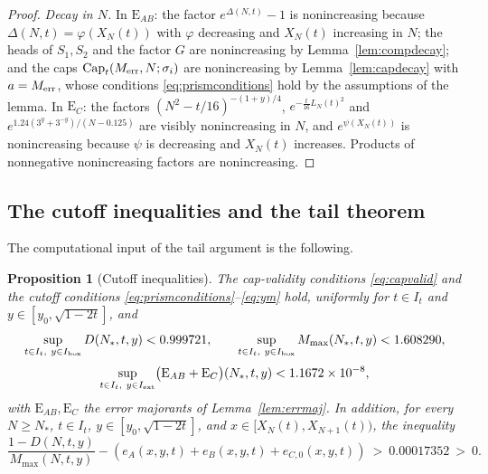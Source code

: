 \documentclass[11pt]{article}
\newtheorem{proposition}[theorem]{Proposition}
\theoremstyle{definition}
\newcommand{\CapT}{\operatorname{Cap}}
\begin{document}
\begin{proof}
\emph{Decay in $N$.} In $\mathrm{E}_{AB}$: the factor
$e^{\Delta(N,t)}-1$ is nonincreasing because
$\Delta(N,t)=\varphi(X_N(t))$ with $\varphi$ decreasing and
$X_N(t)$ increasing in $N$; the heads of $S_1,S_2$ and the factor
$G$ are nonincreasing by Lemma~\ref{lem:compdecay}; and the caps
$\CapT_t(M_{\rm err},N;\sigma_i)$ are nonincreasing by
Lemma~\ref{lem:capdecay} with $a=M_{\rm err}$, whose conditions
\eqref{eq:prismconditions} hold by the assumptions of the lemma. In
$\mathrm{E}_{C}$: the
factors $(N^2-t/16)^{-(1+y)/4}$, $e^{-\frac t{16}L_N(t)^2}$ and
$e^{1.24(3^y+3^{-y})/(N-0.125)}$ are visibly nonincreasing in $N$,
and $e^{\psi(X_N(t))}$ is nonincreasing because $\psi$ is
decreasing and $X_N(t)$ increases. Products of nonnegative
nonincreasing factors are nonincreasing.
\end{proof}

\subsection{The cutoff inequalities and the tail theorem}
\label{sec:tailcert}

The computational input of the tail argument is the following.

\begin{proposition}[Cutoff inequalities]
\label{prop:tailcutoff}
The cap-validity conditions \eqref{eq:capvalid} and the cutoff
conditions \eqref{eq:prismconditions}--\eqref{eq:ym} hold, uniformly for
$t\in I_t$ and $y\in[y_0,\sqrt{1-2t}]$, and
\[
\sup_{t\in I_t,\ y\in I_{\rm box}}D(N_*,t,y)<0.999721,
\qquad
\sup_{t\in I_t,\ y\in I_{\rm box}}M_{\max}(N_*,t,y)<1.608290,
\]
\[
\sup_{t\in I_t,\ y\in I_{\rm ext}}
\bigl(\mathrm{E}_{AB}+\mathrm{E}_{C}\bigr)(N_*,t,y)
<1.1672\times10^{-8},
\]
with $\mathrm{E}_{AB},\mathrm{E}_{C}$ the error majorants of
Lemma~\ref{lem:errmaj}.  In addition, for every
$N\ge N_*$, $t\in I_t$, $y\in[y_0,\sqrt{1-2t}]$, and
$x\in[X_N(t),X_{N+1}(t))$, the inequality
\[
\frac{1-D(N,t,y)}{M_{\max}(N,t,y)}
 -(e_A(x,y,t)+e_B(x,y,t)+e_{C,0}(x,y,t))
 \ >\ 0.00017352\ >\ 0 .
\]
\end{proposition}
\end{document}
